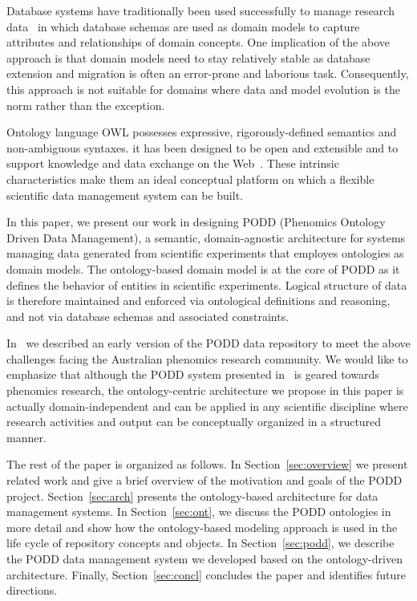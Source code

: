 \documentclass{llncs}
\begin{document}
Database systems have traditionally been used successfully to manage
research data~\cite{brm2007} in which database schemas are used as
domain models to capture attributes and relationships of domain
concepts. One implication of the above approach is that domain models
need to stay relatively stable as database extension and migration is
often an error-prone and laborious task. Consequently, this approach is
not suitable for domains where data and model evolution is the norm
rather than the exception.

Ontology language OWL possesses expressive, rigorously-defined
semantics and non-ambiguous syntaxes. it has been designed to be open
and extensible and to support knowledge and data exchange on the
Web~\cite{aue07dbpedia,journals/bib/RuttenbergRSM09,citeulike:1882392}.
These intrinsic characteristics make them an ideal conceptual platform
on which a flexible scientific data management system can be built.

In this paper, we present our work in designing PODD (Phenomics Ontology 
Driven Data Management), a semantic,
domain-agnostic architecture for systems managing data generated
from scientific experiments that employes ontologies as domain models. The
ontology-based domain model is at the core of PODD as it defines the
behavior of entities in scientific experiments.
Logical structure of data is therefore maintained and enforced via
ontological definitions and reasoning, and not via database schemas and
associated constraints.

In~\cite{podd_icadl} we described an early version of the PODD data
repository to meet the above challenges facing the Australian phenomics
research community. We would like to emphasize that although the PODD system presented
in~\cite{podd_icadl} is geared towards phenomics research, the
ontology-centric architecture we propose in this paper is actually
domain-independent and can be applied in any scientific discipline
where research activities and output can be conceptually organized in a structured
manner.

The rest of the paper is organized as follows. In
Section~\ref{sec:overview} we present related work and give a brief
overview of the motivation and goals of the PODD project.
Section~\ref{sec:arch} presents the ontology-based architecture for
data management systems. In Section~\ref{sec:ont}, we discuss the PODD
ontologies in more detail and show how the ontology-based modeling
approach is used in the life cycle of repository concepts and objects.
In Section~\ref{sec:podd}, we describe the PODD data management
system we developed based on the ontology-driven architecture. Finally,
Section~\ref{sec:concl} concludes the paper and identifies future
directions.
\end{document}
